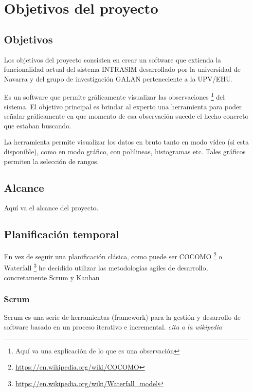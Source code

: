 \chapter{Objetivos del proyecto}


\section{Objetivos}
Los objetivos del proyecto consisten en crear un software que extienda la funcionalidad actual del sistema INTRASIM desarrollado 
por la universidad de Navarra y del grupo de investigación GALAN perteneciente a la UPV/EHU.

Es un software que permite gráficamente visualizar las observaciones \footnote{Aquí va una explicación de lo que es una observación} del sistema.
 El objetivo principal es brindar al experto una herramienta para poder señalar gráficamente en que momento de esa observación sucede el hecho concreto que estaban buscando.

La herramienta permite visualizar los datos en bruto tanto en modo v\'{i}deo (si esta disponible), como en modo gr\'{a}fico, con polilineas, histogramas etc. Tales gráficos permiten la selección de rangos.

\section{Alcance}
Aquí va el alcance del proyecto.

\section{Planificaci\'{o}n temporal}
En vez de seguir una planificación clásica, como puede ser COCOMO \footnote{\url{https://en.wikipedia.org/wiki/COCOMO}} o Waterfall \footnote{\url{https://en.wikipedia.org/wiki/Waterfall_model}} he decidido utilizar las metodologías agiles de desarrollo, concretamente Scrum y Kanban

\subsection{Scrum}
Scrum es una serie de herramientas (framework) para la gestión y desarrollo de software basado en un proceso iterativo e incremental. \emph{cita a la wikipedia}

